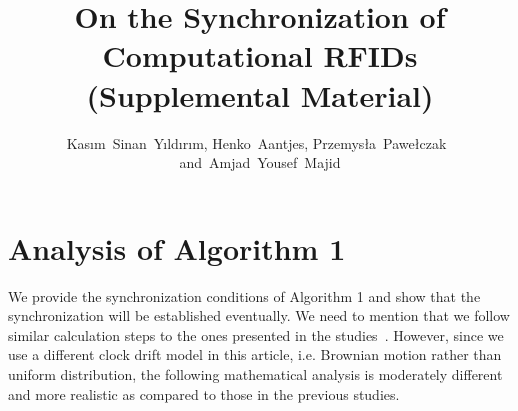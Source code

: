 \documentclass[10pt,journal,compsoc]{IEEEtran}
\begin{document}
\title{On the Synchronization of Computational RFIDs \\
(Supplemental Material)}

\author{Kas{\i}m~Sinan~Y{\i}ld{\i}r{\i}m, 
	Henko~Aantjes, 
	Przemys{\l}a~Pawe{\l}czak~ 
	and~Amjad~Yousef~Majid
}

\maketitle

\IEEEdisplaynontitleabstractindextext

\IEEEpeerreviewmaketitle


\appendices
\section{Analysis of Algorithm 1}

We provide the synchronization conditions of Algorithm 1 and show that the synchronization will be established eventually. We need to mention that we follow similar calculation steps to the ones presented in the studies~\cite{pi2015,Yildirim:Gradient:2016}. However, since we use a different clock drift model in this article, i.e. Brownian motion rather than uniform distribution, the following  mathematical analysis is moderately different and more realistic as compared to those in the previous studies. 
\end{document}
